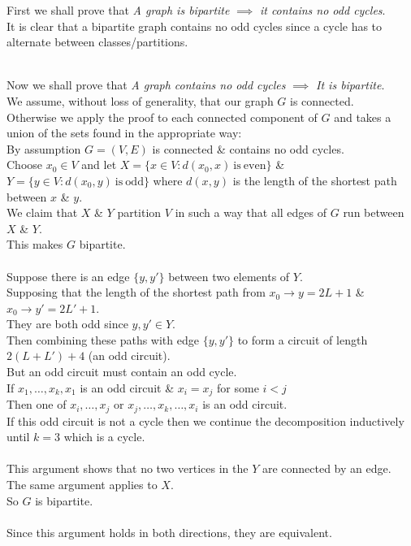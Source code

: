 \documentclass[11pt,a4paper]{article}
\begin{document}
First we shall prove that \textit{A graph is bipartite} $\implies$ \textit{it contains no odd cycles}.\\
It is clear that a bipartite graph contains no odd cycles since a cycle has to alternate between classes/partitions.\\
\\
Now we shall prove that \textit{A graph contains no odd cycles} $\implies$ \textit{It is bipartite}.\\
We assume, without loss of generality, that our graph $G$ is connected.\\
Otherwise we apply the proof to each connected component of $G$ and takes a union of the sets found in the appropriate way:
\\
By assumption $G=(V,E)$ is connected \& contains no odd cycles.\\
Choose $x_0\in V$ and let $X=\{x\in V:d(x_0,x)\mathrm{\ is\ even}\}$ \& $Y=\{y\in V:d(x_0,y)\mathrm{\ is\ odd}\}$ where $d(x,y)$ is the length of the shortest path between $x$ \& $y$.\\
We claim that $X$ \& $Y$ partition $V$ in such a way that all edges of $G$ run between $X$ \& $Y$.\\
This makes $G$ bipartite.\\
\\
Suppose there is an edge $\{y,y'\}$ between two elements of $Y$.\\
Supposing that the length of the shortest path from $x_0\to y=2L+1$ \& $x_0\to y'=2L'+1$.\\
\nb They are both odd since $y,y'\in Y$.\\
Then combining these paths with edge $\{y,y'\}$ to form a circuit of length $2(L+L')+4$ (an odd circuit).\\
But an odd circuit must contain an odd cycle.\\
If $x_1,\dots,x_k,x_1$ is an odd circuit \& $x_i=x_j$ for some $i<j$\\
Then one of $x_i,\dots,x_j$ or $x_j,\dots,x_k,\dots,x_i$ is an odd circuit.\\
If this odd circuit is not a cycle then we continue the decomposition inductively until $k=3$ which is a cycle.\\
\\
This argument shows that no two vertices in the $Y$ are connected by an edge.\\
The same argument applies to $X$.\\
So $G$ is bipartite.\\
\\
Since this argument holds in both directions, they are equivalent.\\
\end{document}
